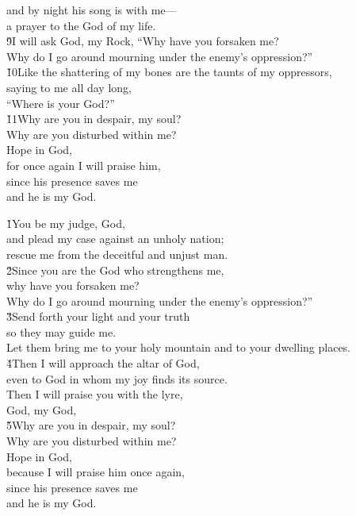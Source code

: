 \begin{poetry}
\poemll    and by night his song is with me--- \\
\poemlll       a prayer to the God of my life. \\
\poeml \v{9}I will ask God, my Rock, ``Why have you forsaken me? \\
\poemll    Why do I go around mourning under the enemy's oppression?'' \\
\poeml \v{10}Like the shattering of my bones are the taunts of my oppressors, \\
\poemll    saying to me all day long, \\
\poemlll       ``Where is your God?'' \\
\poeml \v{11}Why are you in despair, my soul? \\
\poemll    Why are you disturbed within me? \\
\poeml Hope in God, \\
\poemll    for once again I will praise him, \\
\poeml since his presence saves me \\
\poemll    and he is my God.
\end{poetry}

\begin{poetry}
\poeml \v{1}You be my judge, God, \\
\poemll    and plead my case against an unholy nation; \\
\poemlll       rescue me from the deceitful and unjust man. \\
\poeml \v{2}Since you are the God who strengthens me, \\
\poemll    why have you forsaken me? \\
\poeml Why do I go around mourning under the enemy's oppression?'' \\
\poeml \v{3}Send forth your light and your truth \\
\poemll    so they may guide me. \\
\poeml Let them bring me to your holy mountain and to your dwelling places. \\
\poeml \v{4}Then I will approach the altar of God, \\
\poemll    even to God in whom my joy finds its source. \\
\poeml Then I will praise you with the lyre, \\
\poemll    God, my God, \\
\poeml \v{5}Why are you in despair, my soul? \\
\poemll    Why are you disturbed within me? \\
\poeml Hope in God, \\
\poemll    because I will praise him once again, \\
\poeml since his presence saves me \\
\poemll    and he is my God.
\end{poetry}

